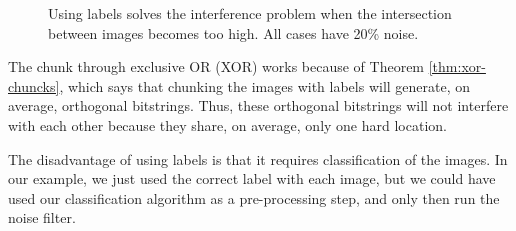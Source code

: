 \begin{figure}[!tb]
  \captionsetup[subfigure]{labelformat=empty}




  \caption{Using labels solves the interference problem when the intersection between images becomes too high. All cases have 20\% noise.
  \label{fig:filter-results2-chunk}
  }
\end{figure}

The chunk through exclusive OR (XOR) works because of Theorem \ref{thm:xor-chuncks}, which says that chunking the images with labels will generate, on average, orthogonal bitstrings. Thus, these orthogonal bitstrings will not interfere with each other because they share, on average, only one hard location.

The disadvantage of using labels is that it requires classification of the images. In our example, we just used the correct label with each image, but we could have used our classification algorithm as a pre-processing step, and only then run the noise filter.

